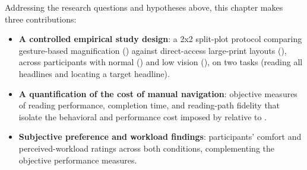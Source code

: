Addressing the research questions and hypotheses above, this chapter makes three contributions:
\begin{itemize}
    \item \textbf{A controlled empirical study design}: a 2x2 split-plot protocol comparing gesture-based magnification (\condonenot) against direct-access large-print layouts (\condtwonot), across participants with normal (\NV) and low vision (\LV), on two tasks (reading all headlines and locating a target headline).
    \item \textbf{A quantification of the cost of manual navigation}: objective measures of reading performance, completion time, and reading-path fidelity that isolate the behavioral and performance cost imposed by \condonenot relative to \condtwonot.
    \item \textbf{Subjective preference and workload findings}: participants' comfort and perceived-workload ratings across both conditions, complementing the objective performance measures.
\end{itemize}

